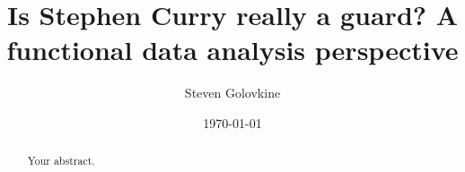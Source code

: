 \documentclass{article}
\title{Is Stephen Curry really a guard? A functional data analysis perspective}
\author{Steven Golovkine}
\date{\today}
\begin{document}
\maketitle

\begin{abstract}
Your abstract.
\end{abstract}



\end{document}
